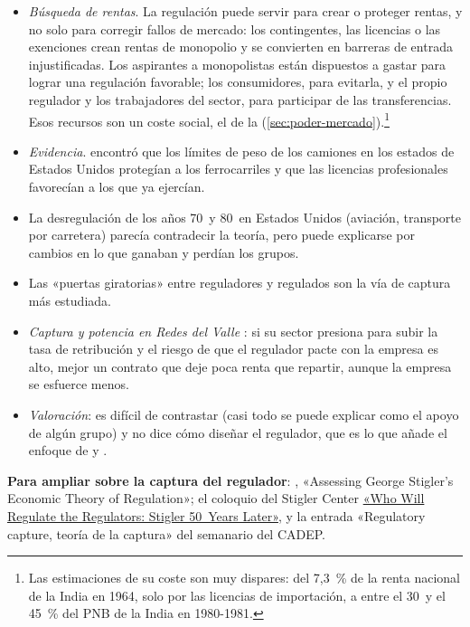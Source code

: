 \documentclass[11pt]{article}
\begin{document}
\begin{itemize}
\item \emph{Búsqueda de rentas}. La regulación puede servir para crear o proteger rentas, y no solo para corregir fallos de mercado: los contingentes, las licencias o las exenciones crean rentas de monopolio y se convierten en barreras de entrada injustificadas. Los aspirantes a monopolistas están dispuestos a gastar para lograr una regulación favorable; los consumidores, para evitarla, y el propio regulador y los trabajadores del sector, para participar de las transferencias. Esos recursos son un coste social, el de la \nocite{Tullock1967Welfare,Krueger1974Political} (\ref{sec:poder-mercado}).\footnote{Las estimaciones de su coste son muy dispares\nocite{Mueller2003Public}: del 7,3~\% de la renta nacional de la India en 1964, solo por las licencias de importación\nocite{Krueger1974Political}, a entre el 30~y el 45~\% del PNB de la India en 1980-1981\nocite{MohammadWhalley1984Rent}.}
\end{itemize}

\begin{itemize}
\item \emph{Evidencia}. \textcite{Stigler1971Theory} encontró que los límites de peso de los camiones en los estados de Estados Unidos protegían a los ferrocarriles y que las licencias profesionales favorecían a los que ya ejercían.
\item La desregulación de los años 70~y 80~en Estados Unidos (aviación, transporte por carretera) parecía contradecir la teoría, pero puede explicarse por cambios en lo que ganaban y perdían los grupos\nocite{Peltzman1989Economic}.
\item Las «puertas giratorias» entre reguladores y regulados son la vía de captura más estudiada\nocite{DalBo2006Regulatory}.
\item \emph{Captura y potencia en Redes del Valle} \parencite{LaffontTirole1991Politics}: si su sector presiona para subir la tasa de retribución y el riesgo de que el regulador pacte con la empresa es alto, mejor un contrato que deje poca renta que repartir, aunque la empresa se esfuerce menos.
\item \emph{Valoración}: es difícil de contrastar (casi todo se puede explicar como el apoyo de algún grupo) y no dice cómo diseñar el regulador, que es lo que añade el enfoque de  y .
\end{itemize}

\begin{anotaciones}
\textbf{Para ampliar sobre la captura del regulador}: \textcite{ProMarket2021Stigler}, «Assessing George Stigler's Economic Theory of Regulation»; el coloquio del Stigler Center \href{https://www.youtube.com/watch?v=lhD5s-4v3oM}{«Who Will Regulate the Regulators: Stigler 50~Years Later»}\nocite{StiglerCenter2021Video}, y la entrada «Regulatory capture, teoría de la captura» del semanario del CADEP\nocite{CadepUFMCaptura}.
\end{anotaciones}
\end{document}
